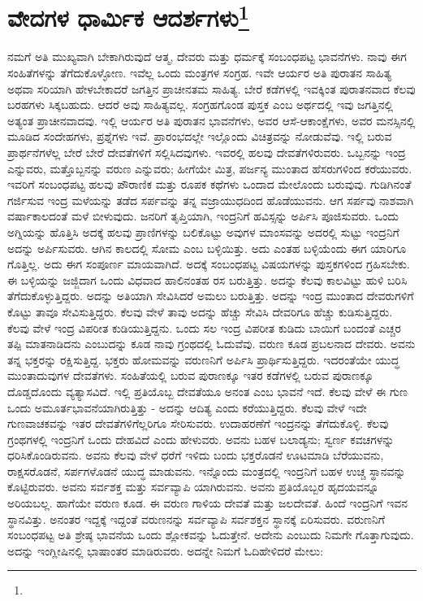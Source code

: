 
\chapter{ವೇದಗಳ ಧಾರ್ಮಿಕ ಆದರ್ಶಗಳು\protect\footnote{}}

ನಮಗೆ ಅತಿ ಮುಖ್ಯವಾಗಿ ಬೇಕಾಗಿರುವುದೆ ಆತ್ಮ, ದೇವರು ಮತ್ತು ಧರ್ಮಕ್ಕೆ ಸಂಬಂಧಪಟ್ಟ ಭಾವನೆಗಳು. ನಾವು ಈಗ ಸಂಹಿತೆಗಳನ್ನು ತೆಗೆದುಕೊಳ್ಳೋಣ. ಇವೆಲ್ಲ ಒಂದು ಮಂತ್ರಗಳ ಸಂಗ್ರಹ. ಇವೇ ಆರ್ಯರ ಅತಿ ಪುರಾತನ ಸಾಹಿತ್ಯ ಅಥವಾ ಸರಿಯಾಗಿ ಹೇಳಬೇಕಾದರೆ ಜಗತ್ತಿನ ಪ್ರಾಚೀನತಮ ಸಾಹಿತ್ಯ. ಬೇರೆ ಕಡೆಗಳಲ್ಲಿ ಇವಕ್ಕಿಂತ ಪುರಾತನವಾದ ಕೆಲವು ಬರಹಗಳು ಸಿಕ್ಕಬಹುದು. ಆದರೆ ಅವು ಸಾಹಿತ್ಯವಲ್ಲ. ಸಂಗ್ರಹಗೊಂಡ ಪುಸ್ತಕ ಎಂಬ ಅರ್ಥದಲ್ಲಿ ಇವು ಜಗತ್ತಿನಲ್ಲಿ ಅತ್ಯಂತ ಪ್ರಾಚೀನವಾದವು. ಇಲ್ಲಿ ಆರ್ಯರ ಅತಿ ಪುರಾತನ ಭಾವನೆಗಳು, ಅವರ ಆಸೆ-ಆಕಾಂಕ್ಷೆಗಳು, ಅವರ ಮನಸ್ಸಿನಲ್ಲಿ ಮೂಡಿದ ಸಂದೇಹಗಳು, ಪ್ರಶ್ನೆಗಳು ಇವೆ. ಪ್ರಾರಂಭದಲ್ಲೇ ಇಲ್ಲೊಂದು ವಿಚಿತ್ರವನ್ನು ನೋಡುವೆವು. ಇಲ್ಲಿ ಬರುವ ಪ್ರಾರ್ಥನೆಗಳೆಲ್ಲ ಬೇರೆ ಬೇರೆ ದೇವತೆಗಳಿಗೆ ಸಲ್ಲಿಸಿದವುಗಳು. ಇವರಲ್ಲಿ ಹಲವು ದೇವತೆಗಳಿರುವರು. ಒಬ್ಬನನ್ನು ಇಂದ್ರ ಎನ್ನುವರು, ಮತ್ತೊಬ್ಬನನ್ನು ವರುಣ ಎನ್ನುವರು; ಹೀಗೆಯೇ ಮಿತ್ರ, ಪರ್ಜನ್ಯ ಮುಂತಾದ ಹೆಸರುಗಳಿಂದ ಕರೆಯುವರು. ಇವರಿಗೆ ಸಂಬಂಧಪಟ್ಟ ಹಲವು ಪೌರಾಣಿಕ ಮತ್ತು ರೂಪಕ ಕಥೆಗಳು ಒಂದಾದ ಮೇಲೊಂದು ಬರುವುವು. ಗುಡಿಗಿನಂತೆ ಗರ್ಜಿಸುವ ಇಂದ್ರ ಮಳೆಯನ್ನು ತಡೆದ ಸರ್ಪವನ್ನು ತನ್ನ ವಜ್ರಾಯುಧದಿಂದ ಹೊಡೆಯುವನು. ಆಗ ಸರ್ಪವು ನಾಶವಾಗಿ ವರ್ಷಾಕಾಲದಂತೆ ಮಳೆ ಬೀಳುವುದು. ಜನರಿಗೆ ತೃಪ್ತಿಯಾಗಿ, ಇಂದ್ರನಿಗೆ ಹವಿಸ್ಸನ್ನು ಅರ್ಪಿಸಿ ಪೂಜಿಸುವರು. ಒಂದು ಅಗ್ನಿಯನ್ನು ಹೊತ್ತಿಸಿ ಅದಕ್ಕೆ ಹಲವು ಪ್ರಾಣಿಗಳನ್ನು ಬಲಿಕೊಟ್ಟು ಅವುಗಳ ಮಾಂಸವನ್ನು ಅದರಲ್ಲಿ ಸುಟ್ಟು ಇಂದ್ರನಿಗೆ ಅದನ್ನು ಅರ್ಪಿಸುವರು. ಆಗಿನ ಕಾಲದಲ್ಲಿ ಸೋಮ ಎಂಬ ಬಳ್ಳಿಯಿತ್ತು. ಅದು ಎಂತಹ ಬಳ್ಳಿಯೆಂದು ಈಗ ಯಾರಿಗೂ ಗೊತ್ತಿಲ್ಲ. ಅದು ಈಗ ಸಂಪೂರ್ಣ ಮಾಯವಾಗಿದೆ. ಅದಕ್ಕೆ ಸಂಬಂಧಪಟ್ಟ ವಿಷಯಗಳನ್ನು ಪುಸ್ತಕಗಳಿಂದ ಗ್ರಹಿಸಬೇಕು. ಈ ಬಳ್ಳಿಯನ್ನು ಜಜ್ಜಿದಾಗ ಒಂದು ವಿಧವಾದ ಹಾಲಿನಂತಹ ರಸ ಬರುತ್ತಿತ್ತು. ಅದನ್ನು ಕೆಲವು ಕಾಲವಿಟ್ಟು ಹುಳಿ ಬರಿಸಿ ತೆಗೆದುಕೊಳ್ಳುತ್ತಿದ್ದರು. ಅದನ್ನು ಅತಿಯಾಗಿ ಸೇವಿಸಿದರೆ ಅಮಲು ಬರುತ್ತಿತ್ತು. ಅದನ್ನು ಇಂದ್ರ ಮುಂತಾದ ದೇವರುಗಳಿಗೆ ಕೊಟ್ಟು ತಾವೂ ಸೇವಿಸುತ್ತಿದ್ದರು. ಕೆಲವು ವೇಳೆ ತಾವು ಅದನ್ನು ಹೆಚ್ಚು ಸೇವಿಸಿ ದೇವರಿಗೂ ಹೆಚ್ಚು ಕುಡಿಸುತ್ತಿದ್ದರು. ಕೆಲವು ವೇಳೆ ಇಂದ್ರ ವಿಪರೀತ ಕುಡಿಯುತ್ತಿದ್ದನು. ಒಂದು ಸಲ ಇಂದ್ರ ವಿಪರೀತ ಕುಡಿದು ಬಾಯಿಗೆ ಬಂದಂತೆ ಎಚ್ಚರ ತಪ್ಪಿ ಮಾತನಾಡಿದನು ಎಂಬುದನ್ನು ಕೂಡ ನಾವು ಗ್ರಂಥದಲ್ಲಿ ಓದುವೆವು. ವರುಣ ಕೂಡ ಪ್ರಬಲನಾದ ದೇವರು. ಅವನು ತನ್ನ ಭಕ್ತರನ್ನು ರಕ್ಷಿಸುತ್ತಿದ್ದ. ಭಕ್ತರು ಹೋಮವನ್ನು ವರುಣನಿಗೆ ಅರ್ಪಿಸಿ ಪ್ರಾರ್ಥಿಸುತ್ತಿದ್ದರು. ಇದರಂತೆಯೇ ಯುದ್ಧ ಮುಂತಾದುವುಗಳ ದೇವತೆಗಳು. ಸಂಹಿತೆಯಲ್ಲಿ ಬರುವ ಪುರಾಣಕ್ಕೂ ಇತರ ಕಡೆಗಳಲ್ಲಿ ಬರುವ ಪುರಾಣಕ್ಕೂ ದೊಡ್ಡದೊಂದು ವ್ಯತ್ಯಾಸವಿದೆ. ಇಲ್ಲಿ ಪ್ರತಿಯೊಬ್ಬ ದೇವತೆಯೂ ಅನಂತ ಎಂಬ ಭಾವನೆ ಇದೆ. ಕೆಲವು ವೇಳೆ ಈ ಗುಣ ಒಂದು ಅಮೂರ್ತಭಾವನೆಯಾಗಿರುತ್ತಿತ್ತು - ಅದನ್ನು ಆದಿತ್ಯ ಎಂದು ಕರೆಯುತ್ತಿದ್ದರು. ಕೆಲವು ವೇಳೆ ಇದೇ ಗುಣವಾಚಕವನ್ನು ಇತರ ದೇವತೆಗಳಿಗೆಲ್ಲರಿಗೂ ಸೇರಿಸುವರು. ಉದಾಹರಣೆಗೆ ಇಂದ್ರನನ್ನು ತೆಗೆದುಕೊಳ್ಳಿ. ಕೆಲವು ಗ್ರಂಥಗಳಲ್ಲಿ ಇಂದ್ರನಿಗೆ ಒಂದು ದೇಹವಿದೆ ಎಂದು ಹೇಳುವರು. ಅವನು ಬಹಳ ಬಲಾಡ್ಯನು; ಸ್ವರ್ಣ ಕವಚಗಳನ್ನು ಧರಿಸಿಕೊಂಡಿರುವನು. ಅವನು ಕೆಲವು ವೇಳೆ ಧರೆಗೆ ಇಳಿದು ಬಂದು ಭಕ್ತರೊಡನೆ ಊಟಮಾಡಿ ಬೆರೆಯುವನು, ರಾಕ್ಷಸರೊಡನೆ, ಸರ್ಪಗಳೊಡನೆ ಯುದ್ಧ ಮಾಡುವನು. ಇನ್ನೊಂದು ಮಂತ್ರದಲ್ಲಿ ಇಂದ್ರನಿಗೆ ಬಹಳ ಉಚ್ಚ ಸ್ಥಾನವನ್ನು ಕೊಟ್ಟಿರುವರು. ಅವನು ಸರ್ವಶಕ್ತ ಮತ್ತು ಸರ್ವವ್ಯಾಪಿ ಯಾಗಿರುವನು. ಅವನು ಪ್ರತಿಯೊಬ್ಬರ ಹೃದಯವನ್ನೂ ಅರಿಯಬಲ್ಲ. ಹಾಗೆಯೇ ವರುಣ ಕೂಡ. ಈ ವರುಣ ಗಾಳಿಯ ದೇವತೆ ಮತ್ತು ಜಲದೇವತೆ. ಹಿಂದೆ ಇಂದ್ರನಿಗೆ ಇವನ ಸ್ಥಾನವಿತ್ತು. ಅನಂತರ ಇದ್ದಕ್ಕೆ ಇದ್ದಂತೆ ವರುಣನನ್ನು ಸರ್ವವ್ಯಾಪಿ ಸರ್ವಶಕ್ತನ ಸ್ಥಾನಕ್ಕೆ ಏರಿಸುವರು. ವರುಣನಿಗೆ ಸಂಬಂಧಪಟ್ಟ ಅತಿ ಶ್ರೇಷ್ಠ ಭಾವನೆಯ ಒಂದು ಶ್ಲೋಕವನ್ನು ಓದುತ್ತೇನೆ. ಅದೇನು ಎಂಬುದು ನಿಮಗೇ ಗೊತ್ತಾಗುವುದು. ಅದನ್ನು ಇಂಗ್ಲೀಷಿನಲ್ಲಿ ಭಾಷಾಂತರ ಮಾಡಿರುವರು. ಅದನ್ನೇ ನಿಮಗೆ ಓದಿಹೇಳಿದರೆ ಮೇಲು:

